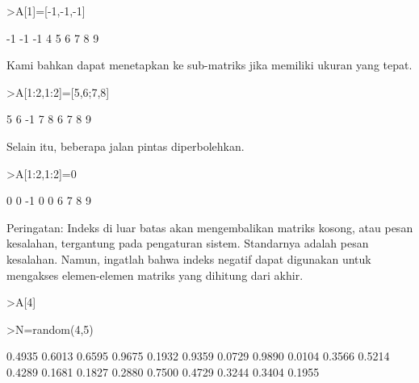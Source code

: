 \documentclass{article}
\begin{document}
\begin{eulernotebook}
\begin{eulercomment}
\end{eulercomment}
\begin{eulerprompt}
>A[1]=[-1,-1,-1]
\end{eulerprompt}
\begin{euleroutput}
             -1            -1            -1 
              4             5             6 
              7             8             9 
\end{euleroutput}
\begin{eulercomment}
Kami bahkan dapat menetapkan ke sub-matriks jika memiliki ukuran yang
tepat.
\end{eulercomment}
\begin{eulerprompt}
>A[1:2,1:2]=[5,6;7,8]
\end{eulerprompt}
\begin{euleroutput}
              5             6            -1 
              7             8             6 
              7             8             9 
\end{euleroutput}
\begin{eulercomment}
Selain itu, beberapa jalan pintas diperbolehkan.
\end{eulercomment}
\begin{eulerprompt}
>A[1:2,1:2]=0
\end{eulerprompt}
\begin{euleroutput}
              0             0            -1 
              0             0             6 
              7             8             9 
\end{euleroutput}
\begin{eulercomment}
Peringatan: Indeks di luar batas akan mengembalikan matriks kosong,
atau pesan kesalahan, tergantung pada pengaturan sistem. Standarnya
adalah pesan kesalahan. Namun, ingatlah bahwa indeks negatif dapat
digunakan untuk mengakses elemen-elemen matriks yang dihitung dari
akhir.
\end{eulercomment}
\begin{eulerprompt}
>A[4]
\end{eulerprompt}
\begin{eulerprompt}
>N=random(4,5)
\end{eulerprompt}
\begin{euleroutput}
       0.4935      0.6013      0.6595      0.9675      0.1932 
       0.9359      0.0729      0.9890      0.0104      0.3566 
       0.5214      0.4289      0.1681      0.1827      0.2880 
       0.7500      0.4729      0.3244      0.3404      0.1955 

\end{euleroutput}
\end{eulernotebook}
\end{document}

